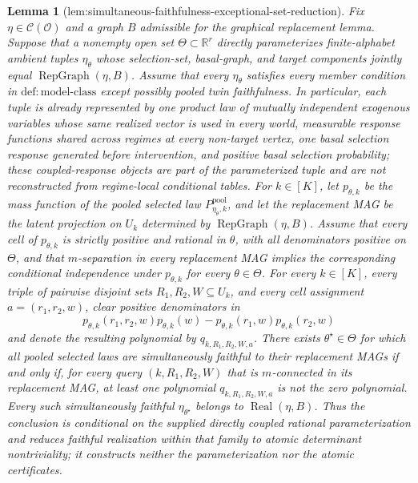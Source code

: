 \documentclass{article}
\newtheorem{lemma}{Lemma}
\begin{document}
\begin{lemma}[lem:simultaneous-faithfulness-exceptional-set-reduction]\label{lem:simultaneous-faithfulness-exceptional-set-reduction}
Fix \(\eta\in\mathcal C(\mathcal O)\) and a graph \(B\) admissible for the graphical replacement lemma. Suppose that a nonempty open set \(\Theta\subset\mathbb R^r\) directly parameterizes finite-alphabet ambient tuples \(\eta_\theta\) whose selection-set, basal-graph, and target components jointly equal \(\operatorname{RepGraph}(\eta,B)\). Assume that every \(\eta_\theta\) satisfies every member condition in \(\mathrm{def:model\mbox{-}class}\) except possibly pooled twin faithfulness. In particular, each tuple is already represented by one product law of mutually independent exogenous variables whose same realized vector is used in every world, measurable response functions shared across regimes at every non-target vertex, one basal selection response generated before intervention, and positive basal selection probability; these coupled-response objects are part of the parameterized tuple and are not reconstructed from regime-local conditional tables. For \(k\in[K]\), let \(p_{\theta,k}\) be the mass function of the pooled selected law \(P_{\eta_\theta,k}^{\mathrm{pool}}\), and let the replacement MAG be the latent projection on \(U_k\) determined by \(\operatorname{RepGraph}(\eta,B)\). Assume that every cell of \(p_{\theta,k}\) is strictly positive and rational in \(\theta\), with all denominators positive on \(\Theta\), and that \(m\)-separation in every replacement MAG implies the corresponding conditional independence under \(p_{\theta,k}\) for every \(\theta\in\Theta\). For every \(k\in[K]\), every triple of pairwise disjoint sets \(R_1,R_2,W\subseteq U_k\), and every cell assignment \(a=(r_1,r_2,w)\), clear positive denominators in
\[
 p_{\theta,k}(r_1,r_2,w)p_{\theta,k}(w)
 -p_{\theta,k}(r_1,w)p_{\theta,k}(r_2,w)
\]
and denote the resulting polynomial by \(q_{k,R_1,R_2,W,a}\). There exists \(\theta^\star\in\Theta\) for which all pooled selected laws are simultaneously faithful to their replacement MAGs if and only if, for every query \((k,R_1,R_2,W)\) that is \(m\)-connected in its replacement MAG, at least one polynomial \(q_{k,R_1,R_2,W,a}\) is not the zero polynomial. Every such simultaneously faithful \(\eta_{\theta^\star}\) belongs to \(\operatorname{Real}(\eta,B)\). Thus the conclusion is conditional on the supplied directly coupled rational parameterization and reduces faithful realization within that family to atomic determinant nontriviality; it constructs neither the parameterization nor the atomic certificates.
\end{lemma}
\end{document}
